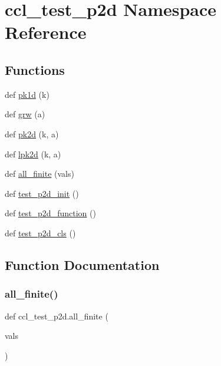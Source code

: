 \hypertarget{namespaceccl__test__p2d}{}\section{ccl\+\_\+test\+\_\+p2d Namespace Reference}
\label{namespaceccl__test__p2d}
\subsection*{Functions}
\begin{DoxyCompactItemize}
\item 
def \mbox{\hyperlink{namespaceccl__test__p2d_a5536c01ff72aab390eae110e38415afc}{pk1d}} (k)
\item 
def \mbox{\hyperlink{namespaceccl__test__p2d_aeebfc76bbb716616e6f0460877f92b4a}{grw}} (a)
\item 
def \mbox{\hyperlink{namespaceccl__test__p2d_a648a656c59c9e119022f605e71fd01d1}{pk2d}} (k, a)
\item 
def \mbox{\hyperlink{namespaceccl__test__p2d_ae34b4286b9d1f9419a5dd925011be309}{lpk2d}} (k, a)
\item 
def \mbox{\hyperlink{namespaceccl__test__p2d_a4b41284ce3002438844d1a7c99790834}{all\+\_\+finite}} (vals)
\item 
def \mbox{\hyperlink{namespaceccl__test__p2d_acca2740a4f8fe77b3c2deffa35829164}{test\+\_\+p2d\+\_\+init}} ()
\item 
def \mbox{\hyperlink{namespaceccl__test__p2d_aaa50f135376935cbc064325a1a344c2b}{test\+\_\+p2d\+\_\+function}} ()
\item 
def \mbox{\hyperlink{namespaceccl__test__p2d_a30d67d0cbda03ae987e45f966c5c2c88}{test\+\_\+p2d\+\_\+cls}} ()
\end{DoxyCompactItemize}


\subsection{Function Documentation}
\mbox{\label{namespaceccl__test__p2d_a4b41284ce3002438844d1a7c99790834}} 
\subsubsection{\texorpdfstring{all\+\_\+finite()}{all\_finite()}}
{\footnotesize\ttfamily def ccl\+\_\+test\+\_\+p2d.\+all\+\_\+finite (\begin{DoxyParamCaption}\item[{}]{vals }\end{DoxyParamCaption})}

